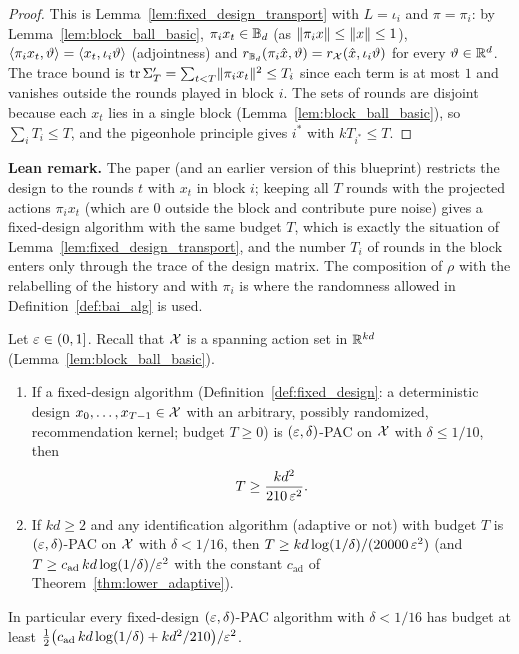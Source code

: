 \begin{proof}
\leanok
{}
This is Lemma~\ref{lem:fixed_design_transport} with $L = \iota_i$ and $\pi = \pi_i$: by
Lemma~\ref{lem:block_ball_basic}, $\pi_ix_t \in \mathbb{B}_d$ (as $\lVert \pi_i x \rVert \le \lVert x \rVert \le 1$),
$\langle \pi_ix_t, \vartheta \rangle = \langle x_t, \iota_i\vartheta \rangle$ (adjointness) and
$r_{\mathbb{B}_d}(\pi_i\hat{x},\vartheta) = r_{\mathcal{X}}(\hat{x},\iota_i\vartheta)$ for every $\vartheta \in \mathbb{R}^d$.
The trace bound is $\operatorname{tr}\Sigma'_T = \sum_{t<T}\lVert \pi_ix_t \rVert^2 \le T_i$ since each term is at
most $1$ and vanishes outside the rounds played in block $i$. The sets of rounds are disjoint
because each $x_t$ lies in a single block (Lemma~\ref{lem:block_ball_basic}), so
$\sum_i T_i \le T$, and the pigeonhole principle gives $i^*$ with $kT_{i^*} \le T$.
\end{proof}

\textbf{Lean remark.} The paper (and an earlier version of this blueprint) restricts the
design to the rounds $t$ with $x_t$ in block $i$; keeping all $T$ rounds with the projected
actions $\pi_ix_t$ (which are $0$ outside the block and contribute pure noise) gives a
fixed-design algorithm with the same budget $T$, which is exactly the situation of
Lemma~\ref{lem:fixed_design_transport}, and the number $T_i$ of rounds in the block enters
only through the trace of the design matrix. The composition of $\rho$ with the relabelling of
the history and with $\pi_i$ is where the randomness allowed in Definition~\ref{def:bai_alg}
is used.

\begin{theorem}\label{thm:separation_lower_nonadaptive}
\leanok
{}
Let $\varepsilon \in (0,1]$. Recall that $\mathcal{X}$ is a spanning action set in $\mathbb{R}^{kd}$
(Lemma~\ref{lem:block_ball_basic}).
\begin{enumerate}
  \item[(i)] If a fixed-design algorithm (Definition~\ref{def:fixed_design}: a deterministic
        design $x_0,\dots,x_{T-1} \in \mathcal{X}$ with an arbitrary, possibly randomized,
        recommendation kernel; budget $T \ge 0$) is $(\varepsilon,\delta)$-PAC on $\mathcal{X}$ with
        $\delta \le 1/10$, then
        \[
          T \ge \frac{k d^2}{210\,\varepsilon^2} .
        \]
  \item[(ii)] If $kd \ge 2$ and any identification algorithm (adaptive or not) with budget $T$
        is $(\varepsilon,\delta)$-PAC on $\mathcal{X}$ with $\delta < 1/16$, then
        $T \ge kd\log(1/\delta)/(20000\,\varepsilon^2)$ (and $T \ge c_{\mathrm{ad}}\,kd\log(1/\delta)/\varepsilon^2$
        with the constant $c_{\mathrm{ad}}$ of Theorem~\ref{thm:lower_adaptive}).
\end{enumerate}
\end{theorem}
In particular every fixed-design $(\varepsilon,\delta)$-PAC algorithm with $\delta < 1/16$ has
budget at least
$\tfrac12\big( c_{\mathrm{ad}}\,kd\log(1/\delta) + kd^2/210 \big)/\varepsilon^2$.

